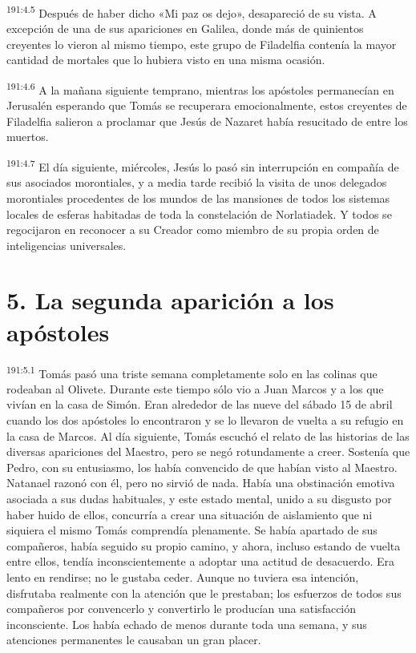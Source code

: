\par 
\textsuperscript{191:4.5} Después de haber dicho «Mi paz os dejo», desapareció de su vista. A excepción de una de sus apariciones en Galilea, donde más de quinientos creyentes lo vieron al mismo tiempo, este grupo de Filadelfia contenía la mayor cantidad de mortales que lo hubiera visto en una misma ocasión.

\par 
\textsuperscript{191:4.6} A la mañana siguiente temprano, mientras los apóstoles permanecían en Jerusalén esperando que Tomás se recuperara emocionalmente, estos creyentes de Filadelfia salieron a proclamar que Jesús de Nazaret había resucitado de entre los muertos.

\par 
\textsuperscript{191:4.7} El día siguiente, miércoles, Jesús lo pasó sin interrupción en compañía de sus asociados morontiales, y a media tarde recibió la visita de unos delegados morontiales procedentes de los mundos de las mansiones de todos los sistemas locales de esferas habitadas de toda la constelación de Norlatiadek. Y todos se regocijaron en reconocer a su Creador como miembro de su propia orden de inteligencias universales.

\section*{5. La segunda aparición a los apóstoles}
\par 
\textsuperscript{191:5.1} Tomás pasó una triste semana completamente solo en las colinas que rodeaban al Olivete. Durante este tiempo sólo vio a Juan Marcos y a los que vivían en la casa de Simón. Eran alrededor de las nueve del sábado 15 de abril cuando los dos apóstoles lo encontraron y se lo llevaron de vuelta a su refugio en la casa de Marcos. Al día siguiente, Tomás escuchó el relato de las historias de las diversas apariciones del Maestro, pero se negó rotundamente a creer. Sostenía que Pedro, con su entusiasmo, los había convencido de que habían visto al Maestro. Natanael razonó con él, pero no sirvió de nada. Había una obstinación emotiva asociada a sus dudas habituales, y este estado mental, unido a su disgusto por haber huido de ellos, concurría a crear una situación de aislamiento que ni siquiera el mismo Tomás comprendía plenamente. Se había apartado de sus compañeros, había seguido su propio camino, y ahora, incluso estando de vuelta entre ellos, tendía inconscientemente a adoptar una actitud de desacuerdo. Era lento en rendirse; no le gustaba ceder. Aunque no tuviera esa intención, disfrutaba realmente con la atención que le prestaban; los esfuerzos de todos sus compañeros por convencerlo y convertirlo le producían una satisfacción inconsciente. Los había echado de menos durante toda una semana, y sus atenciones permanentes le causaban un gran placer.

